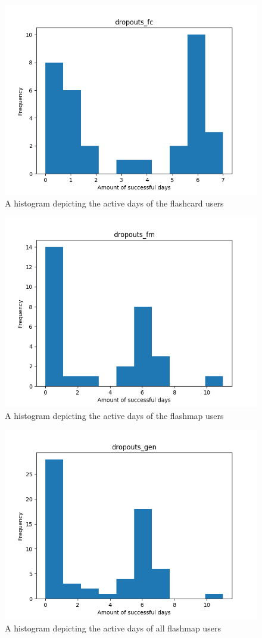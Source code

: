 \begin{figure}
    \centering
    \includegraphics[width=.7\textwidth]{img/dropouts_fc.png}
    \caption{A histogram depicting the active days of the flashcard users}
    \label{fig:dropouts_fc}
\end{figure}
\begin{figure}
    \centering
    \includegraphics[width=.7\textwidth]{img/dropouts_fm.png}
    \caption{A histogram depicting the active days of the flashmap users}
    \label{fig:dropouts_fm}
\end{figure}
\begin{figure}
    \centering
    \includegraphics[width=.7\textwidth]{img/dropouts_gen.png}
    \caption{A histogram depicting the active days of all flashmap users}
    \label{fig:dropouts_gen}
\end{figure}
